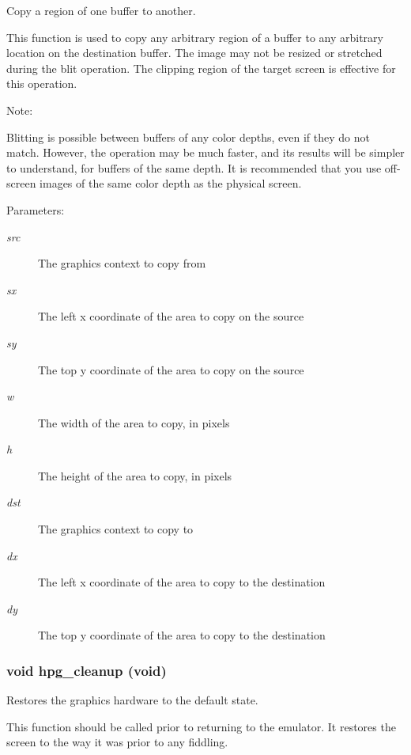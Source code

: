 Copy a region of one buffer to another.

This function is used to copy any arbitrary region of a buffer to any arbitrary location on the destination buffer. The image may not be resized or stretched during the blit operation. The clipping region of the target screen is effective for this operation.

\begin{Desc}
\item[Note: ]\par
Blitting is possible between buffers of any color depths, even if they do not match. However, the operation may be much faster, and its results will be simpler to understand, for buffers of the same depth. It is recommended that you use off-screen images of the same color depth as the physical screen.\end{Desc}
\begin{Desc}
\item[Parameters: ]\par
\begin{description}
\item[{\em 
src}]The graphics context to copy from \item[{\em 
sx}]The left x coordinate of the area to copy on the source \item[{\em 
sy}]The top y coordinate of the area to copy on the source \item[{\em 
w}]The width of the area to copy, in pixels \item[{\em 
h}]The height of the area to copy, in pixels \item[{\em 
dst}]The graphics context to copy to \item[{\em 
dx}]The left x coordinate of the area to copy to the destination \item[{\em 
dy}]The top y coordinate of the area to copy to the destination \end{description}
\end{Desc}
\subsubsection{\setlength{\rightskip}{0pt plus 5cm}void hpg\_\-cleanup (void)}\label{hpgraphics_8h_a29}


Restores the graphics hardware to the default state.

This function should be called prior to returning to the emulator. It restores the screen to the way it was prior to any fiddling. 
